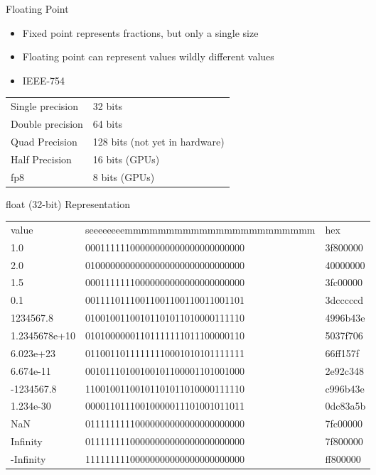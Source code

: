 \begin{withoutheadline}
\begin{frame}[fragile]{Floating Point}
\begin{itemize}
    \item Fixed point represents fractions, but only a single size
    \item Floating point can represent values wildly different values
    \item IEEE-754
\end{itemize}
\begin{tabular}{p{4cm}|p{5cm}} \toprule
Single precision & 32 bits \\
Double precision & 64 bits \\
Quad Precision   & 128 bits (not yet in hardware) \\
Half Precision   & 16 bits  (GPUs) \\
fp8              & 8 bits  (GPUs)  \\ \bottomrule
\end{tabular}
\end{frame}

\begin{frame}[fragile]{float (32-bit) Representation}
\setlength{\tabcolsep}{2pt}
\scriptsize
\ttfamily
\begin{tabular}{p{2cm}|p{10cm}|p{2cm}}
value         & seeeeeeeemmmmmmmmmmmmmmmmmmmmmmm &      hex \\
1.0           & 00011111100000000000000000000000 & 3f800000 \\
2.0           & 01000000000000000000000000000000 & 40000000 \\
1.5           & 00011111110000000000000000000000 & 3fc00000 \\
0.1           & 00111101110011001100110011001101 & 3dcccccd \\
1234567.8     & 01001001100101101011010000111110 & 4996b43e \\
1.2345678e+10 & 01010000001101111111011100000110 & 5037f706 \\
6.023e+23     & 01100110111111110001010101111111 & 66ff157f \\
6.674e-11     & 00101110100100101100001101001000 & 2e92c348 \\
-1234567.8    & 11001001100101101011010000111110 & c996b43e \\
1.234e-30     & 00001101110010000011101001011011 & 0dc83a5b \\
NaN           & 01111111110000000000000000000000 & 7fc00000 \\
Infinity      & 01111111100000000000000000000000 & 7f800000 \\
-Infinity     & 11111111100000000000000000000000 & ff800000 \\
\end{tabular}
\end{frame}


\end{withoutheadline}
